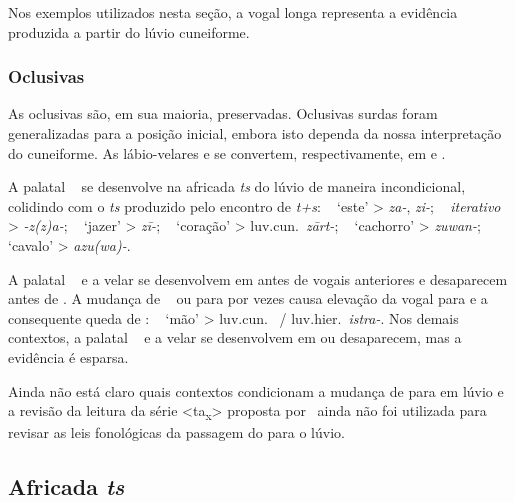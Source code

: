 Nos exemplos utilizados nesta seção, a vogal longa representa a evidência
produzida a partir do lúvio cuneiforme.


\subsubsection{Oclusivas}

As oclusivas são, em sua maioria, preservadas.
Oclusivas surdas foram generalizadas para a posição inicial, embora isto dependa
da nossa interpretação do cuneiforme.
As lábio-velares
 e  se convertem,
respectivamente, em  e .

A palatal \pac~ se desenvolve na africada \emph{ts}
do lúvio de maneira incondicional, colidindo com o \emph{ts} produzido pelo
encontro de \emph{t+s}:
\pac~ `este' >
\emph{za-}, \emph{zi-};
\pac~ \emph{iterativo} >
\emph{-z{(z)}a-};
\pac~ `jazer' > \emph{zī-};
\pac~ `coração' > luv.cun.\ \emph{zārt-};
\pac~ `cachorro' > \emph{zuwan-};
\pac~ `cavalo' > \emph{azu{(wa)}-}.

A palatal \pac~ e a velar
 se desenvolvem em  antes de vogais
anteriores e desaparecem antes de .
A mudança de \pac~ ou 
para  por vezes causa elevação da vogal  para
 e a consequente queda de :
\pac~ `mão' >
luv.cun.\ \emph{} \slash{} luv.hier.\ \emph{istra-}.
Nos demais contextos, a palatal \pac~ e a velar
 se desenvolvem em  ou desaparecem,
mas a evidência é esparsa.

Ainda não está claro quais contextos condicionam a mudança de
 para  em lúvio e a revisão da leitura da
série <ta\textsubscript{x}> proposta por~\citet{Rieken2008} ainda não foi
utilizada para revisar as leis fonológicas da passagem do \pac{} para o lúvio.

\subsection{Africada \emph{ts}}


